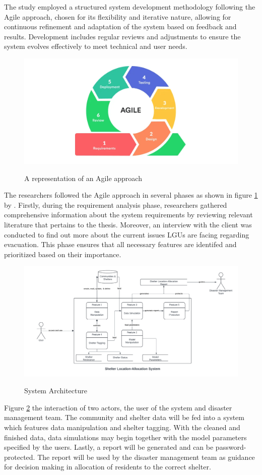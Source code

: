 \documentclass[11pt,letterpaper,]{article}
\begin{document}
	The study employed a structured system development methodology following the Agile approach, chosen for its flexibility and iterative nature, allowing for continuous refinement and adaptation of the system based on feedback and results. Development includes regular reviews and adjustments to ensure the system evolves effectively to meet technical and user needs. 
	
	\begin{figure}[h!]
		\caption{A representation of an Agile approach}
		\centering
		\includegraphics[width=0.9\columnwidth]{AGILE}
		\label{Agile}
	\end{figure}
	
	The researchers followed the Agile approach in several phases as shown in figure \ref{Agile} by \textcite{Jayathilaka2020}. Firstly, during the requirement analysis phase, researchers gathered comprehensive information about the system requirements by reviewing relevant literature that pertains to the thesis. Moreover, an interview with the client was conducted to find out more about the current issues LGUs are facing regarding evacuation. This phase ensures that all necessary features are identifed and prioritized based on their importance.
	
	\begin{figure}[h!]
		\caption{System Architecture}
		\centering
		\includegraphics[width=0.75\columnwidth]{Context Diagram}
		\label{SystemArch}
	\end{figure}
	Figure \ref{SystemArch} the interaction of two actors, the user of the system and disaster management team. The community and shelter data will be fed into a system which features data manipulation and shelter tagging. With the cleaned and finished data, data simulations may begin together with the model parameters specified by the users. Lastly, a report will be generated and can be password-protected. The report will be used by the disaster management team as guidance for decision making in allocation of residents to the correct shelter.
	
\end{document}
